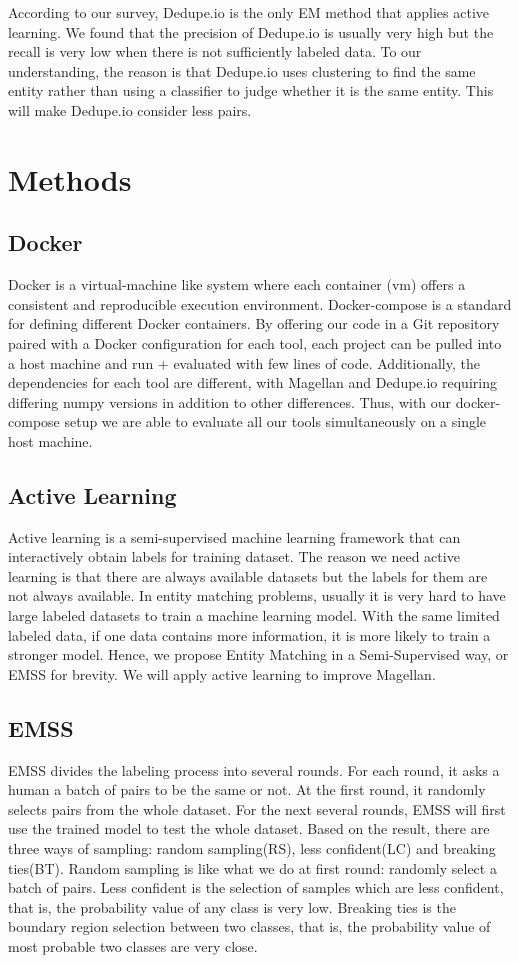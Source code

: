 \documentclass[letterpaper,twocolumn,10pt]{article}
\begin{document}
According to our survey, Dedupe.io is the only EM method that applies active learning. We found that the precision of Dedupe.io is usually very high but the recall is very low when there is not sufficiently labeled data. To our understanding, the reason is that Dedupe.io uses clustering to find the same entity rather than using a classifier to judge whether it is the same entity. This will make Dedupe.io consider less pairs. 

\section{Methods}

\subsection{Docker}
Docker is a virtual-machine like system where each container (vm) offers a consistent and reproducible execution environment. Docker-compose is a standard for defining different Docker containers. By offering our code in a Git repository paired with a Docker configuration for each tool, each project can be pulled into a host machine and run + evaluated with few lines of code. Additionally, the dependencies for each tool are different, with  Magellan and Dedupe.io requiring differing numpy versions in addition to other differences. Thus, with our docker-compose setup we are able to evaluate all our tools simultaneously on a single host machine.

\subsection{Active Learning}
Active learning is a semi-supervised machine learning framework that can interactively obtain labels for training dataset. The reason we need active learning is that there are always available datasets but the labels for them are not always available. In entity matching problems, usually it is very hard to have large labeled datasets to train a machine learning model. With the same limited labeled data, if one data contains more information, it is more likely to train a stronger model. Hence, we propose Entity Matching in a Semi-Supervised way, or EMSS for brevity. We will apply active learning to improve Magellan. 

\subsection{EMSS}
EMSS divides the labeling process into several rounds. For each round, it asks a human a batch of pairs to be the same or not. At the first round, it randomly selects pairs from the whole dataset. For the next several rounds, EMSS will first use the trained model to test the whole dataset. Based on the result, there are three ways of sampling: random sampling(RS), less confident(LC) and breaking ties(BT). Random sampling is like what we do at first round: randomly select a batch of pairs. Less confident is the selection of samples which are less confident, that is, the probability value of any class is very low. Breaking ties is the boundary region selection between two classes, that is, the probability value of most probable two classes are very close.
\end{document}
